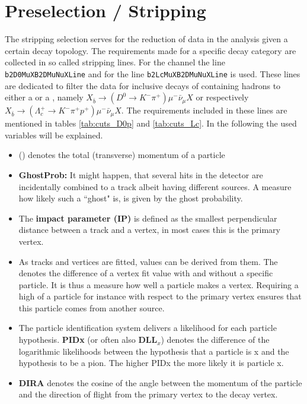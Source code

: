 \section{Preselection / Stripping}
The stripping selection serves for the reduction of data in the analysis given a certain decay topology.
The requirements made for a specific decay category are collected in so called stripping lines.
For the \LbToDpmunuX channel the line \texttt{b2D0MuXB2DMuNuXLine} and for \LbToLcmunu the line \texttt{b2LcMuXB2DMuNuXLine} is used.
These lines are dedicated to filter the data for inclusive decays of \bquark containing hadrons to either a \Dz\mun or a \Lc\mun, namely $X_{\bar{b}} \rightarrow (D^0 \rightarrow K^- \pi^+) \mu^- \bar{\nu}_{\mu} X$ or respectively $X_{\bar{b}} \rightarrow (\Lambda_c^+ \rightarrow K^- \pi^+ p^+) \mu^- \bar{\nu}_{\mu} X$.
The requirements included in these lines are mentioned in tables \ref{tab:cuts_D0p} and \ref{tab:cuts_Lc}.
In the following the used variables will be explained.
\begin{itemize}
    \item \ptot (\pt) denotes the total (transverse) momentum of a particle
    \item \textbf{GhostProb:} It might happen, that several hits in the detector are incidentally combined to a track albeit having different sources. 
          A measure how likely such a ``ghost" is, is given by the ghost probability.
    \item The \textbf{impact parameter (IP)} is defined as the smallest perpendicular distance between a track and a vertex, in most cases this is the primary vertex.
    \item As tracks and vertices are fitted, \textbf{\chisq} values can be derived from them. 
          The \textbf{\chisqip} denotes the difference of a vertex fit \chisq value with and without a specific particle. 
          It is thus a measure how well a particle makes a vertex. 
          Requiring a high \chisqip of a particle for instance with respect to the primary vertex ensures that this particle comes from another source.
    \item The particle identification system delivers a likelihood for each particle hypothesis.
          \textbf{PIDx} (or often also \textbf{DLL$_x$}) denotes the difference of the logarithmic likelihoods between the hypothesis that a particle is x and the hypothesis to be a pion.
          The higher PIDx the more likely it is particle x.
    \item \textbf{DIRA} denotes the cosine of the angle between the momentum of the particle and the direction of flight from the primary vertex to the decay vertex.
\end{itemize}

